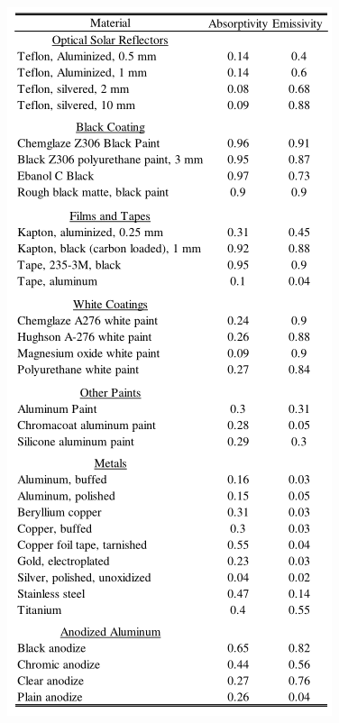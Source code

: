 \documentclass[final]{cubedoc}
\begin{document}
\begin{figure}[h!]
    \centering
    \includegraphics[keepaspectratio, height=.8\textheight, width=\textwidth]{docs/small_sat_properties.png}
    \caption{\cite[p.111]{boushon2018}}
    \label{fig:copper_alloys}
\end{figure}
\end{document}
